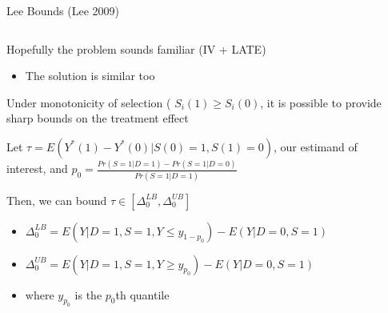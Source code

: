 \documentclass[notes,11pt, aspectratio=169]{beamer}
\newenvironment{wideitemize}{\itemize\addtolength{\itemsep}{10pt}}{\enditemize}
\begin{document}
\begin{frame}{Lee Bounds (Lee 2009)}
      \begin{columns}[onlytextwidth, T] %
        \begin{column}{.9\textwidth}
          \begin{wideitemize}
          \item Hopefully the problem sounds familiar (IV + LATE)
            \begin{itemize}
            \item The solution is similar too
            \end{itemize}
          \item Under monotonicity of selection (
            $S_{i}(1) \geq S_{i}(0)$, it is possible to provide sharp
            bounds on the treatment effect
          \item Let $\tau = E(Y^{*}(1) - Y^{*}(0) | S(0) = 1, S(1) = 0)$, our estimand of interest, and $p_{0} = \frac{Pr(S = 1 | D = 1) - Pr(S = 1| D = 0)}{Pr(S = 1 | D = 1)}$
          \item Then, we can bound $\tau \in [\Delta_{0}^{LB}, \Delta_{0}^{UB}]$
            \begin{itemize}
            \item $\Delta_{0}^{LB} = E(Y | D = 1, S = 1, Y \leq y_{1-p_{0}}) - E(Y | D = 0, S = 1)$
            \item $\Delta_{0}^{UB} = E(Y | D = 1, S = 1, Y \geq y_{p_{0}}) - E(Y | D = 0, S = 1)$
            \item where $y_{p_{0}}$ is the $p_{0}$th quantile
            \end{itemize}
          \end{wideitemize}
      \end{column}%
      \hfill%
      \begin{column}{.5\textwidth}

      \end{column}%
    \end{columns}
\end{frame}
\end{document}
